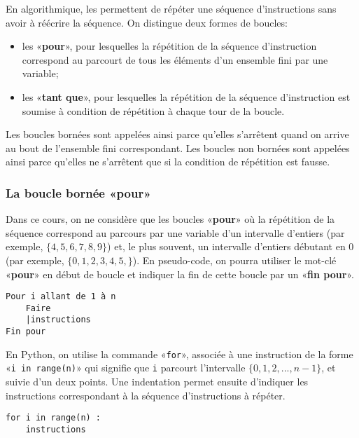 En algorithmique, les  permettent de répéter une séquence d'instructions sans avoir à réécrire la séquence. On distingue deux formes de boucles:
\begin{itemize}
	\item les  «{\ttfamily\bf pour}», pour lesquelles la répétition de la séquence d'instruction correspond au parcourt de tous les éléments d'un ensemble fini par une variable;
	\item les  «{\ttfamily\bf tant que}», pour lesquelles la répétition de la séquence d'instruction est soumise à condition de répétition à chaque tour de la boucle.
\end{itemize}
Les boucles bornées sont appelées ainsi parce qu'elles s'arrêtent quand on arrive au bout de l'ensemble fini correspondant. Les boucles non bornées sont appelées ainsi parce qu'elles ne s'arrêtent que si la condition de répétition est fausse.

\subsubsection{La boucle bornée «{\ttfamily\bf pour}»}

Dans ce cours, on ne considère que les boucles «{\ttfamily\bf pour}» où la répétition de la séquence correspond au parcours par une variable d'un intervalle d'entiers (par exemple, $\{4,5,6,7,8,9\}$) et, le plus souvent, un intervalle d'entiers débutant en 0 (par exemple, $\{0,1,2,3,4,5,\}$). En pseudo-code, on pourra utiliser le mot-clé «{\ttfamily\bf pour}» en début de boucle et indiquer la fin de cette boucle par un «{\ttfamily\bf fin pour}».
\begin{center}
	\begin{varwidth}[t]{.5\textwidth}
\begin{lstlisting}[language=Pseudo,linewidth=6cm]
Pour i allant de 1 à n
    Faire
    |instructions
Fin pour\end{lstlisting}\end{varwidth}\end{center}

En Python, on utilise la commande «\texttt{for}», associée à une instruction de la forme «\texttt{i in range(n)}» qui signifie que \texttt{i} parcourt l'intervalle $\{0,1,2,...,n-1\}$, et suivie d'un deux points. Une indentation permet ensuite d'indiquer les instructions correspondant à la séquence d'instructions à répéter.
\begin{center}\begin{varwidth}[t]{.5\textwidth}
\begin{lstlisting}[language=iPython,linewidth=5cm]
for i in range(n) :
    instructions
\end{lstlisting}
\end{varwidth}\end{center}

